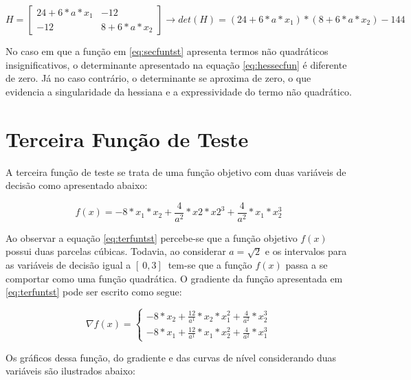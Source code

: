 \begin{equation}\label{eq:hessecfun}
    H = \begin{bmatrix}
                    24+6*a*x_1 & -12 \\
                    -12 & 8+6*a*x_2
                \end{bmatrix} \rightarrow det(H) = (24+6*a*x_1)*(8+6*a*x_2)-144   
\end{equation}

No caso em que a função em \ref{eq:secfuntst}  apresenta termos não quadráticos insignificativos, o determinante apresentado na equação \ref{eq:hessecfun} é diferente de zero. Já no caso contrário, o determinante se aproxima de zero, o que evidencia a singularidade da hessiana e a expressividade do termo não quadrático.

\section{Terceira Função de Teste}\label{sec:terfun}

A terceira função de teste se trata de uma função objetivo com duas variáveis de decisão como apresentado abaixo:

\begin{equation}\label{eq:terfuntst}
    f(x)=-8*x_1*x_2+\frac{4}{a^2}*x2*x2^3+\frac{4}{a^2}*x_1*x_2^3
\end{equation}

Ao observar a equação \ref{eq:terfuntst} percebe-se que a função objetivo $f(x)$ possui duas parcelas cúbicas. Todavia, ao considerar $a=\sqrt{2}$ e os intervalos para as variáveis de decisão igual a $[\ 0 , 3 ]\ $ tem-se  que a função $f(x)$ passa a se comportar como uma função quadrática. O gradiente da função apresentada em \ref{eq:terfuntst} pode ser escrito como segue:

\begin{equation}\label{eq:gradterfuntst}
    \nabla f(x) = \begin{cases}
         -8*x_2+\frac{12}{a^1}*x_2*x_1^2+\frac{4}{a^2}*x_2^3\\
         -8*x_1+\frac{12}{a^1}*x_1*x_2^2+\frac{4}{a^2}*x_1^3
    \end{cases}
\end{equation} 
   	   
Os gráficos dessa função, do gradiente e das curvas de nível considerando duas variáveis são ilustrados abaixo:


